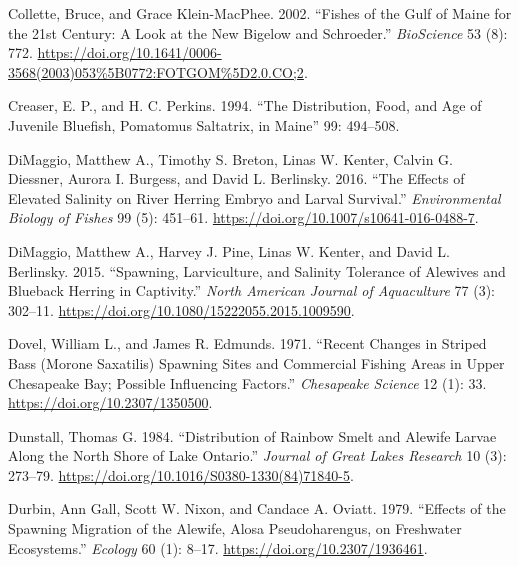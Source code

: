 \documentclass[
]{book}
\newlength{\cslhangindent}
\newlength{\cslentryspacingunit} %
\newenvironment{CSLReferences}[2] %
 {%
  \setlength{\parindent}{0pt}
  \ifodd #1
  \let\oldpar\par
  \def\par{\hangindent=\cslhangindent\oldpar}
  \fi
  \setlength{\parskip}{#2\cslentryspacingunit}
 }%
 {}
\begin{document}
\begin{CSLReferences}{1}{0}
\leavevmode{}%
Collette, Bruce, and Grace Klein-MacPhee. 2002. {``Fishes of the {Gulf} of {Maine} for the 21st {Century}: {A} {Look} at the {New} {Bigelow} and {Schroeder}.''} \emph{BioScience} 53 (8): 772. \url{https://doi.org/10.1641/0006-3568(2003)053\%5B0772:FOTGOM\%5D2.0.CO;2}.

\leavevmode{}%
Creaser, E. P., and H. C. Perkins. 1994. {``The Distribution, Food, and Age of Juvenile Bluefish, {Pomatomus} Saltatrix, in {Maine}''} 99: 494--508.

\leavevmode{}%
DiMaggio, Matthew A., Timothy S. Breton, Linas W. Kenter, Calvin G. Diessner, Aurora I. Burgess, and David L. Berlinsky. 2016. {``The Effects of Elevated Salinity on River Herring Embryo and Larval Survival.''} \emph{Environmental Biology of Fishes} 99 (5): 451--61. \url{https://doi.org/10.1007/s10641-016-0488-7}.

\leavevmode{}%
DiMaggio, Matthew A., Harvey J. Pine, Linas W. Kenter, and David L. Berlinsky. 2015. {``Spawning, {Larviculture}, and {Salinity} {Tolerance} of {Alewives} and {Blueback} {Herring} in {Captivity}.''} \emph{North American Journal of Aquaculture} 77 (3): 302--11. \url{https://doi.org/10.1080/15222055.2015.1009590}.

\leavevmode{}%
Dovel, William L., and James R. Edmunds. 1971. {``Recent {Changes} in {Striped} {Bass} ({Morone} Saxatilis) {Spawning} {Sites} and {Commercial} {Fishing} {Areas} in {Upper} {Chesapeake} {Bay}; {Possible} {Influencing} {Factors}.''} \emph{Chesapeake Science} 12 (1): 33. \url{https://doi.org/10.2307/1350500}.

\leavevmode{}%
Dunstall, Thomas G. 1984. {``Distribution of {Rainbow} {Smelt} and {Alewife} {Larvae} {Along} the {North} {Shore} of {Lake} {Ontario}.''} \emph{Journal of Great Lakes Research} 10 (3): 273--79. \url{https://doi.org/10.1016/S0380-1330(84)71840-5}.

\leavevmode{}%
Durbin, Ann Gall, Scott W. Nixon, and Candace A. Oviatt. 1979. {``Effects of the {Spawning} {Migration} of the {Alewife}, {Alosa} {Pseudoharengus}, on {Freshwater} {Ecosystems}.''} \emph{Ecology} 60 (1): 8--17. \url{https://doi.org/10.2307/1936461}.


\end{CSLReferences}
\end{document}
